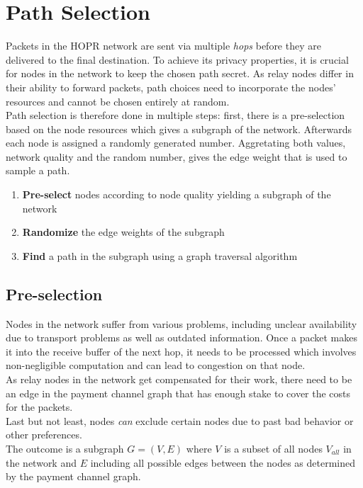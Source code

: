 \section{Path Selection}
\label{sec:path-selection}

Packets in the HOPR network are sent via multiple \textit{hops} before they are delivered to the final destination. To achieve its privacy properties, it is crucial for nodes in the network to keep the chosen path secret. As relay nodes differ in their ability to forward packets, path choices need to incorporate the nodes' resources and cannot be chosen entirely at random.
\\Path selection is therefore done in multiple steps: first, there is a pre-selection based on the node resources which gives a subgraph of the network. Afterwards each node is assigned a randomly generated number. Aggretating both values, network quality and the random number, gives the edge weight that is used to sample a path.

\begin{enumerate}
    \item \textbf{Pre-select} nodes according to node quality yielding a subgraph of the network
    \item \textbf{Randomize} the edge weights of the subgraph
    \item \textbf{Find} a path in the subgraph using a graph traversal algorithm
\end{enumerate}

\subsection{Pre-selection}
\label{sec:pathselection:pre-selection}

Nodes in the network suffer from various problems, including unclear availability due to transport problems as well as outdated information. Once a packet makes it into the receive buffer of the next hop, it needs to be processed which involves non-negligible computation and can lead to congestion on that node.
\\As relay nodes in the network get compensated for their work, there need to be an edge in the payment channel graph that has enough stake to cover the costs for the packets.
\\Last but not least, nodes \textit{can} exclude certain nodes due to past bad behavior or other preferences.
\\The outcome is a subgraph $G = (V, E)$ where $V$ is a subset of all nodes $V_{all}$ in the network and $E$ including all possible edges between the nodes as determined by the payment channel graph.

